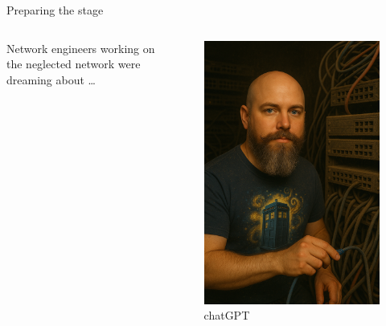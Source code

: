 \documentclass[aspectratio=169]{beamer}
\begin{document}
\begin{frame}{Preparing the stage}

  \begin{columns}
    \begin{column}{0.4\textwidth}
      Network engineers working on the neglected network were dreaming about \dots
    \end{column}
    \begin{column}{0.4\textwidth}
      \begin{figure}
        \includegraphics[height = 0.7\textheight]{images/urs_old_datacenter.png}
        \caption{\footnotesize chatGPT}
      \end{figure}
    \end{column}
  \end{columns}

\end{frame}
\end{document}
